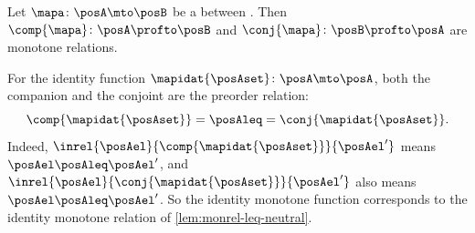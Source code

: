 \begin{lemma}
    \label{lem:companion-conjoint-monotone}
    Let $\mapa \colon \posA \mto \posB$ be a  between .
    Then $\comp{\mapa} \colon \posA \profto \posB$ and $\conj{\mapa} \colon \posB \profto \posA$ are monotone relations.
\end{lemma}


\begin{example}
    \label{exa:companion-identity}
    For the identity function $\mapidat{\posAset} \colon \posA \mto \posA$, both the companion and the conjoint are the preorder relation:
    \begin{equation}
        \comp{\mapidat{\posAset}} = \posAleq = \conj{\mapidat{\posAset}}.
    \end{equation}
    Indeed, $\inrel{\posAel}{\comp{\mapidat{\posAset}}}{\posAel'}$ means $\posAel \posAleq \posAel'$, and $\inrel{\posAel}{\conj{\mapidat{\posAset}}}{\posAel'}$ also means $\posAel \posAleq \posAel'$.
    So the identity monotone function corresponds to the identity monotone relation of \cref{lem:monrel-leq-neutral}.
\end{example}

